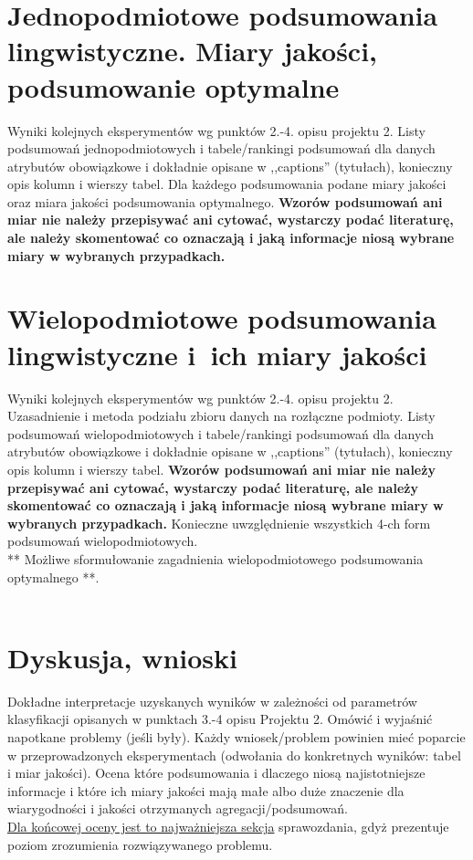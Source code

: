 \documentclass{article}
\begin{document}
\section{ Jednopodmiotowe podsumowania lingwistyczne. Miary jakości, podsumowanie optymalne}
Wyniki kolejnych eksperymentów wg punktów 2.-4. opisu projektu 2.  Listy podsumowań
jednopodmiotowych i tabele/rankingi podsumowań dla danych atrybutów obowiązkowe i dokładnie opisane w ,,captions'' (tytułach), konieczny opis kolumn i wierszy tabel. Dla każdego podsumowania podane miary jakości oraz miara jakości podsumowania
optymalnego. {\bf Wzorów podsumowań ani miar nie należy przepisywać ani cytować, wystarczy podać literaturę, ale
należy skomentować co oznaczają i jaką informacje niosą wybrane miary w wybranych
przypadkach.}\\

\section{Wielopodmiotowe podsumowania lingwistyczne i~ich miary jakości} 
Wyniki kolejnych eksperymentów wg punktów 2.-4. opisu projektu 2. Uzasadnienie i
metoda podziału zbioru danych na rozłączne podmioty. Listy podsumowań
wielopodmiotowych i tabele/rankingi podsumowań dla danych atrybutów obowiązkowe i
dokładnie opisane w ,,captions'' (tytułach), konieczny opis kolumn i wierszy tabel.
{\bf Wzorów podsumowań ani miar nie należy przepisywać ani cytować, wystarczy podać literaturę, ale
należy skomentować co oznaczają i jaką informacje niosą wybrane miary w wybranych
przypadkach.} Konieczne uwzględnienie wszystkich 4-ch form podsumowań wielopodmiotowych. 
\\ 

** Możliwe sformułowanie zagadnienia wielopodmiotowego podsumowania optymalnego **.\\
\\



\section{Dyskusja, wnioski}
Dokładne interpretacje uzyskanych wyników w zależności od parametrów klasyfikacji
opisanych w punktach 3.-4 opisu Projektu 2. 
Omówić i wyjaśnić napotkane problemy (jeśli były). Każdy wniosek/problem powinien mieć poparcie
w przeprowadzonych eksperymentach (odwołania do konkretnych wyników: tabel i miar
jakości). Ocena które podsumowania i dlaczego niosą najistotniejsze informacje
i które ich miary jakości mają małe albo duże znaczenie dla wiarygodności i jakości otrzymanych
agregacji/podsumowań.  \\
\underline{Dla końcowej oceny jest to najważniejsza sekcja} sprawozdania, gdyż prezentuje poziom
zrozumienia rozwiązywanego problemu.\\
\end{document}
